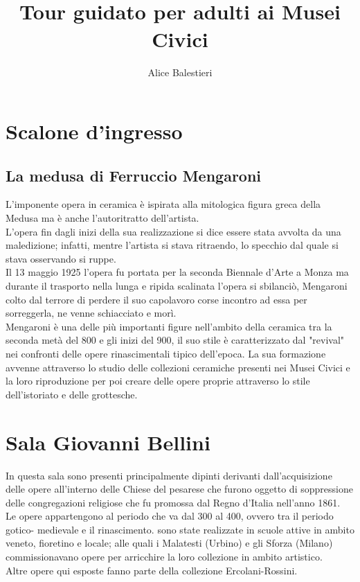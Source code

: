 \documentclass[12pt,a4paper]{article}
\begin{document}
	
	\title{\textbf{\\Tour guidato per adulti ai Musei Civici}}
	\author{Alice Balestieri}
	\date{}
	
	\maketitle
	\newpage
	
	\tableofcontents
	\newpage
	
	\section{Scalone d'ingresso}
	
	\subsection{La medusa di Ferruccio Mengaroni}
	L'imponente opera in ceramica è ispirata alla mitologica figura greca della Medusa ma è anche l’autoritratto dell'artista.\\
	L'opera fin dagli inizi della sua realizzazione si dice essere stata avvolta da una maledizione; infatti, mentre l'artista si stava ritraendo, lo specchio dal quale si stava osservando si ruppe.\\
	Il 13 maggio 1925 l'opera fu portata per la seconda Biennale d'Arte a Monza ma durante il trasporto nella lunga e ripida scalinata l'opera si sbilanciò, Mengaroni colto dal terrore di perdere il suo capolavoro corse incontro ad essa per sorreggerla, ne venne schiacciato e morì.\\
	Mengaroni è una delle più importanti figure nell'ambito della ceramica tra la seconda metà del 800 e gli inizi del 900, il suo stile è caratterizzato dal "revival" nei confronti delle opere rinascimentali tipico dell'epoca. La sua formazione avvenne attraverso lo studio delle collezioni ceramiche presenti nei Musei Civici e la loro riproduzione per poi creare delle opere proprie attraverso lo stile dell'istoriato e delle grottesche.
	
	\section{Sala Giovanni Bellini}
	In questa sala sono presenti principalmente dipinti derivanti dall'acquisizione delle opere all'interno delle Chiese del pesarese che furono oggetto di soppressione delle congregazioni religiose che fu promossa dal Regno d'Italia nell'anno 1861.\\
	Le opere appartengono al periodo che va dal  300 al 400, ovvero tra il periodo gotico- medievale e il rinascimento. sono state realizzate in scuole attive in ambito veneto, fioretino e locale; alle quali i Malatesti (Urbino) e gli Sforza (Milano) commissionavano opere per arricchire la loro collezione in ambito artistico.\\
	Altre opere qui esposte fanno parte della collezione Ercolani-Rossini.
	
\end{document}
